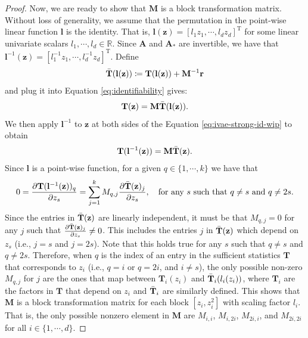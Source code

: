 \documentclass[10pt]{article} %
\theoremstyle{plain}
\theoremstyle{definition}
\begin{document}
\begin{proof}
    Now, we are ready to show that $\mathbf{M}$ is a block transformation matrix. Without loss of generality, we assume that the permutation in the point-wise linear function $\mathbf{l}$ is the identity. That is, $\mathbf{l}(\mathbf{z})=[l_1 z_1,\cdots,l_d z_d]^{\text{T}}$ for some linear univariate scalars $l_1,\cdots,l_d\in\mathbb{R}$. Since $\mathbf{A}$ and $\mathbf{A}_{*}$ are invertible, we have that $\mathbf{l}^{-1}(\mathbf{z})=[l_1^{-1} z_1,\cdots,l_d^{-1} z_d]^{\text{T}}$. Define
    \begin{align}
        \Bar{\mathbf{T}}(\mathbf{l}(\mathbf{z}))\coloneqq\mathbf{T}(\mathbf{l}(\mathbf{z}))+\mathbf{M}^{-1}\mathbf{r}
    \end{align}
    and plug it into Equation \eqref{eq:identifiability} gives:
    \begin{align}
        \mathbf{T}(\mathbf{z})=\mathbf{M}\Bar{\mathbf{T}}(\mathbf{l}(\mathbf{z})).\label{eq:ivae-strong-id-wip}
    \end{align}
    We then apply $\mathbf{l}^{-1}$ to $\mathbf{z}$ at both sides of the Equation \eqref{eq:ivae-strong-id-wip} to obtain
    \begin{align}
        \mathbf{T}(\mathbf{l}^{-1}(\mathbf{z}))=\mathbf{M}\Bar{\mathbf{T}}(\mathbf{z}).
    \end{align}
    Since $\mathbf{l}$ is a point-wise function, for a given $q\in\{1,\cdots,k\}$ we have that 
    \begin{align}\label{eq:proof_perm}
        0 = \frac{\partial \mathbf{T}(\mathbf{l}^{-1}(\mathbf{z}))_q}{\partial z_s}=\sum_{j=1}^k M_{q,j}\frac{\partial \Bar{\mathbf{T}}(\mathbf{z})_j}{\partial z_s},\quad\text{for any $s$ such that $q\not=s$ and $q\not=2s$}.
    \end{align}
    Since the entries in $\Bar{\mathbf{T}}(\mathbf{z})$ are linearly independent, it must be that $M_{q,j}=0$ for any $j$ such that $\frac{\partial \Bar{\mathbf{T}}(\mathbf{z})_j}{\partial z_s}\not=0$. This includes the entries $j$ in $\Bar{\mathbf{T}}(\mathbf{z})$ which depend on $z_s$ (i.e., $j=s$ and $j=2s$). Note that this holds true for any $s$ such that $q\not=s$ and $q\not=2s$. Therefore, when $q$ is the index of an entry in the sufficient statistics $\mathbf{T}$ that corresponds to $z_i$ (i.e., $q=i$ or $q=2i$, and $i\not=s$), the only possible non-zero $M_{q,j}$ for $j$ are the ones that map between $\mathbf{T}_i(z_i)$ and $\Bar{\mathbf{T}}_i(l_i(z_i))$, where $\mathbf{T}_i$ are the factors in $\mathbf{T}$ that depend on $z_i$ and $\Bar{\mathbf{T}}_i$ are similarly defined. This shows that $\mathbf{M}$ is a block transformation matrix for each block $[z_i,z_i^2]$ with scaling factor $l_i$. That is, the only possible nonzero element in $\mathbf{M}$ are $M_{i,i}$, $M_{i,2i}$, $M_{2i,i}$, and $M_{2i,2i}$ for all $i\in\{1,\cdots,d\}$.
    

\end{proof}
\end{document}
